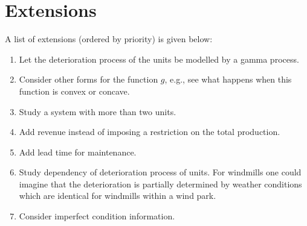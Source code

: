 \documentclass[a4paper,11pt]{article}
\begin{document}
\section{Extensions}
A list of extensions (ordered by priority) is given below:
\begin{enumerate}
	\item Let the deterioration process of the units be modelled by a gamma process.
	\item Consider other forms for the function $g$, e.g., see what happens when this function is convex or concave.
	\item Study a system with more than two units.
	\item Add revenue instead of imposing a restriction on the total production.
	\item Add lead time for maintenance.
	\item Study dependency of deterioration process of units. For windmills one could imagine that the deterioration is partially determined by weather conditions which are identical for windmills within a wind park.
	\item Consider imperfect condition information.
\end{enumerate}
\end{document}
